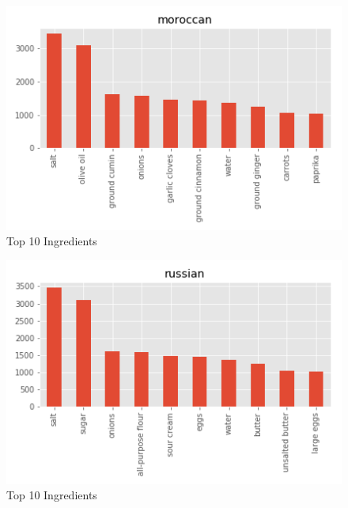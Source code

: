 \documentclass[sigconf]{acmart}
\begin{document}
\begin{figure}[!ht]
  \centering\includegraphics[width=\columnwidth]{images/moroccan_10_most_used_ingredients.png}
  \caption{Top 10 Ingredients }\label{f:moroccan_10_most_used_ingredients}
\end{figure}

\begin{figure}[!ht]
  \centering\includegraphics[width=\columnwidth]{images/russian_10_most_used_ingredients.png}
  \caption{Top 10 Ingredients }\label{f:russian_10_most_used_ingredients}
\end{figure}
\end{document}
